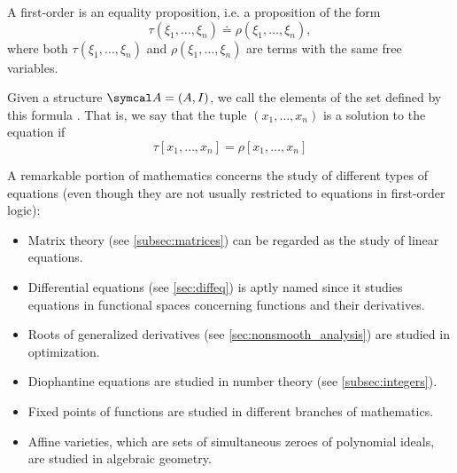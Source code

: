 \begin{definition}\label{def:first_order_equation}
  A first-order  is an equality proposition, i.e. a proposition of the form
  \begin{equation*}
    \tau(\xi_1, \ldots, \xi_n) \doteq \rho(\xi_1, \ldots, \xi_n),
  \end{equation*}
  where both \( \tau(\xi_1, \ldots, \xi_n) \) and \( \rho(\xi_1, \ldots, \xi_n) \) are terms with the same free variables.

  Given a structure \( \Cal{A} = (A, I) \), we call the elements of the set defined by this formula . That is, we say that the tuple \( (x_1, \ldots, x_n) \) is a solution to the equation if
  \begin{equation*}
    \tau[x_1, \ldots, x_n] = \rho[x_1, \ldots, x_n]
  \end{equation*}
\end{definition}

\begin{remark}\label{remark:equations}
  A remarkable portion of mathematics concerns the study of different types of equations (even though they are not usually restricted to equations in first-order logic):

  \begin{itemize}
    \item Matrix theory (see \cref{subsec:matrices}) can be regarded as the study of linear equations.
    \item Differential equations (see \cref{sec:diffeq}) is aptly named since it studies equations in functional spaces concerning functions and their derivatives.
    \item Roots of generalized derivatives (see \cref{sec:nonsmooth_analysis}) are studied in optimization.
    \item Diophantine equations are studied in number theory (see \cref{subsec:integers}).
    \item Fixed points of functions are studied in different branches of mathematics.
    \item Affine varieties, which are sets of simultaneous zeroes of polynomial ideals, are studied in algebraic geometry.
  \end{itemize}
\end{remark}


